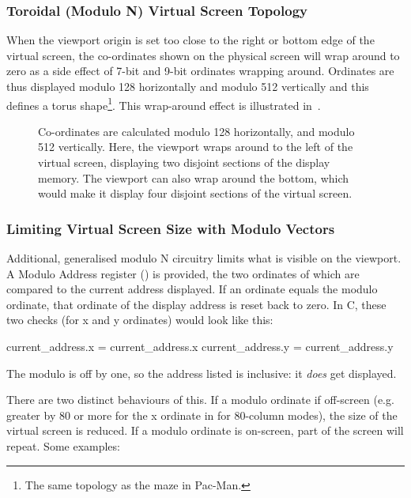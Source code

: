 \subsubsection{Toroidal (Modulo N) Virtual Screen Topology}

When the viewport origin is set too close to the right or bottom edge of the
virtual screen, the co-ordinates shown on the physical screen will wrap around
to zero as a side effect of 7-bit and 9-bit ordinates wrapping
around. Ordinates are thus displayed modulo 128 horizontally and modulo 512
vertically and this defines a torus shape\footnote{The same topology as the
  maze in Pac-Man.}. This wrap-around effect is illustrated
in~.

\begin{figure}
 \centering
 \caption[Toroidal Topology of the Virtual
   Screen]{\label{fig:vdu-virtual-screen-torus} Co-ordinates are calculated
   modulo 128 horizontally, and modulo 512 vertically. Here, the viewport wraps
   around to the left of the virtual screen, displaying two disjoint sections
   of the display memory. The viewport can also wrap around the bottom, which
   would make it display four disjoint sections of the virtual screen.}
\end{figure}



\subsubsection{Limiting Virtual Screen Size with Modulo Vectors}
\label{vdu:sec:modulo-address}
Additional, generalised modulo N circuitry limits what is visible on the
viewport. A Modulo Address register () is provided, the two
ordinates of which are compared to the current address displayed. If an
ordinate equals the modulo ordinate, that ordinate of the display address is
reset back to zero. In C, these two checks (for x and y ordinates) would look
like this:

\begin{ccode}
  current_address.x = current_address.x %
  current_address.y = current_address.y %
\end{ccode}

The modulo is off by one, so the address listed is inclusive: it {\em does\/}
get displayed.

There are two distinct behaviours of this. If a modulo ordinate if off-screen
(e.g. greater by 80 or more for the x ordinate in for 80-column modes), the
size of the virtual screen is reduced. If a modulo ordinate is on-screen, part
of the screen will repeat. Some examples:

